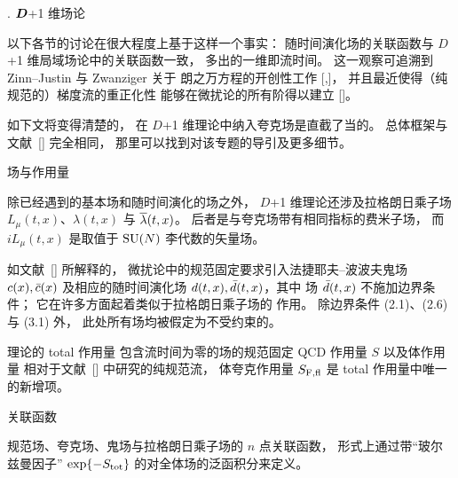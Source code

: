 
. $\boldsymbol D$+1 维场论

以下各节的讨论在很大程度上基于这样一个事实：
随时间演化场的关联函数与
$D$+1 维局域场论中的关联函数一致，
多出的一维即流时间。
这一观察可追溯到 Zinn--Justin 与 Zwanziger 关于
朗之万方程的开创性工作 [\cite{Zinn},\cite{ZinnZwanziger}]，
并且最近使得（纯规范的）梯度流的重正化性
能够在微扰论的所有阶得以建立
[\cite{RenFlow}]。

如下文将变得清楚的，
在 $D$+1 维理论中纳入夸克场是直截了当的。
总体框架与文献~[\cite{RenFlow}] 完全相同，
那里可以找到对该专题的导引及更多细节。


 场与作用量

除已经遇到的基本场和随时间演化的场之外，
$D$+1 维理论还涉及拉格朗日乘子场
$L_{\mu}(t,x)$、$\lambda(t,x)$ 与 $\overline{\lambda}(t,x)$。
后者是与夸克场带有相同指标的费米子场，
而 $iL_{\mu}(t,x)$ 是取值于 ${\rm SU}(N)$ 李代数的矢量场。

如文献~[\cite{RenFlow}] 所解释的，
微扰论中的规范固定要求引入法捷耶夫--波波夫鬼场
$c(x),\bar{c}(x)$ 及相应的随时间演化场 $d(t,x),\bar{d}(t,x)$，其中
场 $\bar{d}(t,x)$ 不施加边界条件；
它在许多方面起着类似于拉格朗日乘子场的
作用。
除边界条件 (2.1)、(2.6) 与 (3.1) 外，
此处所有场均被假定为不受约束的。

理论的 total 作用量
包含流时间为零的场的规范固定 QCD 作用量 $S$
以及体作用量
相对于文献~[\cite{RenFlow}] 中研究的纯规范流，
体夸克作用量 $S_{\rm F,fl}$ 是 total 作用量中唯一的新增项。


 关联函数

规范场、夸克场、鬼场与拉格朗日乘子场的
$n$ 点关联函数，
形式上通过带``玻尔兹曼因子''
$\exp\{-S_{\rm tot}\}$ 的对全体场的泛函积分来定义。

